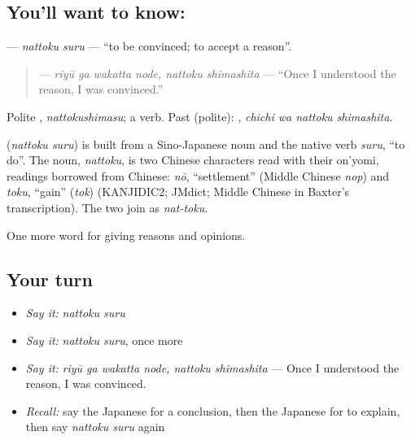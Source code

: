 \subsection*{You'll want to know: }
\textbf{} — \emph{nattoku suru} — \textquotedblleft{}to be convinced; to accept a reason\textquotedblright{}.

\begin{quote}
\textbf{ } — \emph{riyū ga wakatta node, nattoku shimashita} — \textquotedblleft{}Once I understood the reason, I was convinced.\textquotedblright{}
\end{quote}

Polite \textbf{}, \emph{nattokushimasu}; a  verb. Past (polite): \textbf{ }, \emph{chichi wa nattoku shimashita}.

\begin{cousinweb}
\textbf{} (\emph{nattoku suru}) is built from a Sino-Japanese noun and the native verb \emph{suru}, \textquotedblleft{}to do\textquotedblright{}. The noun, \emph{nattoku}, is two Chinese characters read with their on'yomi, readings borrowed from Chinese: \emph{nō}, \textquotedblleft{}settlement\textquotedblright{} (Middle Chinese \emph{nop}) and \emph{toku}, \textquotedblleft{}gain\textquotedblright{} (\emph{tok}) (KANJIDIC2; JMdict; Middle Chinese in Baxter's transcription). The two join as \emph{nat-toku}.
\end{cousinweb}

\begin{grammarlens}[title={What you've built}]
One more word for giving reasons and opinions.
\end{grammarlens}

\subsection*{Your turn}
\begin{itemize}
\raggedright
  \item \emph{Say it:} \emph{nattoku suru}
  \item \emph{Say it:} \emph{nattoku suru}, once more
  \item \emph{Say it:} \emph{riyū ga wakatta node, nattoku shimashita} — Once I understood the reason, I was convinced.
  \item \emph{Recall:} say the Japanese for a conclusion, then the Japanese for to explain, then say \emph{nattoku suru} again
\end{itemize}

